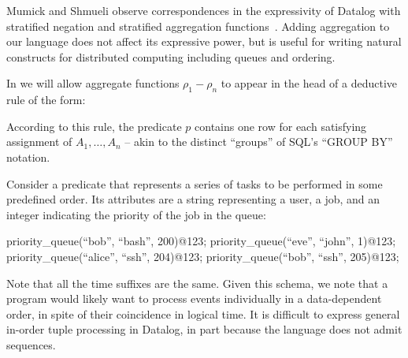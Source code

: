 


Mumick and Shmueli observe correspondences in the expressivity of Datalog with stratified negation and stratified aggregation functions~\cite{mumickshmueli}.  Adding aggregation to our language does not affect its expressive power, but is useful for writing natural constructs for distributed computing including queues and ordering.  

In \lang we will allow
aggregate functions $\rho_1 - \rho_n$ to appear
in the head of a deductive rule of the form:

\linebreak{}

According to this rule, the predicate $p$ contains one row for each satisfying assignment of $A_1, \ldots, A_n$ -- akin to the distinct ``groups'' of SQL's ``GROUP BY'' notation.



Consider a predicate  that represents a series of tasks to be performed in some predefined order.  Its attributes are a string representing a user, a job, and an integer
indicating the priority of the job in the queue:

\begin{Dedalus}
priority\_queue(``bob'', ``bash'', 200)@123;
priority\_queue(``eve'', ``john'', 1)@123;
priority\_queue(``alice'', ``ssh'', 204)@123;
priority\_queue(``bob'', ``ssh'', 205)@123;
\end{Dedalus}

Note that all the time suffixes are the same.  
Given this schema, we note that a program would likely want to process
 events individually in a data-dependent order, in
spite of their coincidence in logical time.  It is difficult to express general
in-order tuple processing in Datalog, in part because the language does not
admit sequences.  

